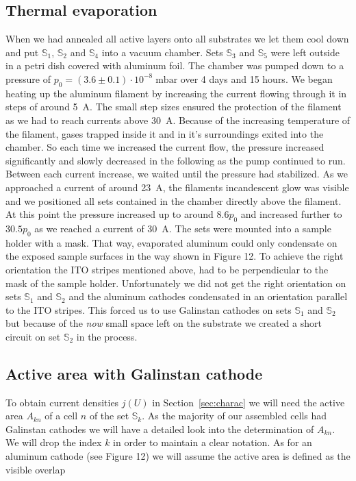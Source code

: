 \documentclass[a4paper,10pt,twocolumn]{article}
\begin{document}
\begin{extract*}
\subsection{Thermal evaporation}\label{subsec:therm-eva}
When we had annealed all active layers onto all substrates we let them cool down and put $\mathbb{S}_1$, $\mathbb{S}_2$ and $\mathbb{S}_4$ into a vacuum chamber. Sets $\mathbb{S}_3$ and $\mathbb{S}_5$ were left outside in a petri dish covered with aluminum foil. The chamber was pumped down to a pressure of $p_0 = (3.6\pm 0.1)\cdot 10^{-8}\; \mathrm{mbar}$ over 4 days and 15 hours.\mypar
We began heating up the aluminum filament by increasing the current flowing through it in steps of around 5~A. The small step sizes ensured the protection of the filament as we had to reach currents above 30~A. Because of the increasing temperature of the filament, gases trapped inside it and in it's surroundings exited into the chamber. So each time we increased the current flow, the pressure increased significantly and slowly decreased in the following as the pump continued to run. Between each current increase, we waited until the pressure had stabilized. As we approached a current of around 23~A, the filaments incandescent glow was visible and we positioned all sets contained in the chamber directly above the filament. At this point the pressure increased up to around $8.6p_0$ and increased further to $30.5p_0$ as we reached a current of 30~A.\mypar
The sets were mounted into a sample holder with a mask. That way, evaporated aluminum could only condensate on the exposed sample surfaces in the way shown in \cite{labdesc} Figure 12. To achieve the right orientation the ITO stripes mentioned above, had to be perpendicular to the mask of the sample holder. Unfortunately we did not get the right orientation on sets $\mathbb{S}_1$ and $\mathbb{S}_2$ and the aluminum cathodes condensated in an orientation parallel to the ITO stripes. This forced us to use Galinstan cathodes on sets $\mathbb{S}_1$ and $\mathbb{S}_2$ but because of the \emph{now} small space left on the substrate we created a short circuit on set $\mathbb{S}_2$ in the process.

\subsection{Active area with Galinstan cathode}

To obtain current densities $j(U)$ in Section~\ref{sec:charac} we will need the active area $A_{kn}$ of a cell $n$ of the set $\mathbb{S}_k$. As the majority of our assembled cells had Galinstan cathodes we will have a detailed look into the determination of $A_{kn}$. We will drop the index $k$ in order to maintain a clear notation.\mypar
As for an aluminum cathode (see \cite{labdesc} Figure 12) we will assume the active area is defined as the visible overlap 


\end{extract*}
\end{document}
